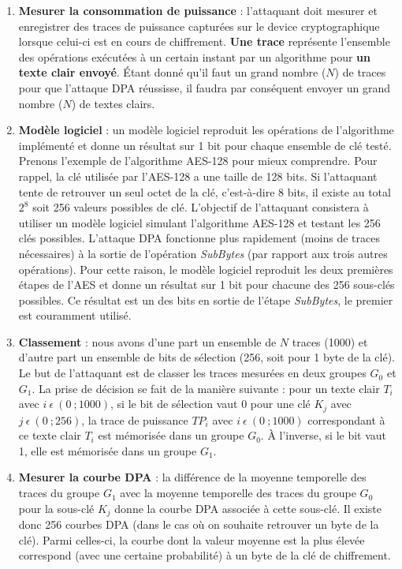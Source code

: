 \documentclass[oneside]{book}
\begin{document}
\begin{enumerate}
\item \textbf{Mesurer la consommation de puissance} : l'attaquant doit mesurer et enregistrer des traces de puissance capturées sur le device cryptographique lorsque celui-ci est en cours de chiffrement. \textbf{Une trace} représente l'ensemble des opérations exécutées à un certain instant par un algorithme pour \textbf{un texte clair envoyé}. Étant donné qu'il faut un grand nombre ($N$) de traces pour que l'attaque DPA réussisse, il faudra par conséquent envoyer un grand nombre ($N$) de textes clairs.
\item \textbf{Modèle logiciel} : un modèle logiciel reproduit les opérations de l’algorithme implémenté et donne un résultat sur 1 bit pour chaque ensemble de clé testé. Prenons l'exemple de l'algorithme AES-128 pour mieux comprendre. Pour rappel, la clé utilisée par l'AES-128 a une taille de 128 bits. Si l'attaquant tente de retrouver un seul octet de la clé, c'est-à-dire 8 bits, il existe au total $2^{8}$ soit 256 valeurs possibles de clé. L'objectif de l'attaquant consistera à utiliser un modèle logiciel simulant l'algorithme AES-128 et testant les 256 clés possibles. L'attaque DPA fonctionne plus rapidement (moins de traces nécessaires) à la sortie de l'opération \textit{SubBytes} \cite{mangard_power_2007} (par rapport aux trois autres opérations). Pour cette raison, le modèle logiciel reproduit les deux premières étapes de l’AES et donne un résultat sur 1 bit pour chacune des 256 sous-clés possibles. Ce résultat est un des bits en sortie de l’étape \textit{SubBytes}, le premier est couramment utilisé.
\item \textbf{Classement} : nous avons d'une part un ensemble de $N$ traces (1000) et d'autre part un ensemble de bits de sélection (256, soit pour 1 byte de la clé). Le but de l'attaquant est de classer les traces mesurées en deux groupes $G_0$ et $G_1$. La prise de décision se fait de la manière suivante : pour un texte clair $T_i$ avec $i \ \epsilon \ (0 \ ;1000)$, si le bit de sélection vaut 0 pour une clé $K_j$ avec $j \ \epsilon \ (0 \ ; 256)$, la trace de puissance $TP_i$ avec $i \ \epsilon \ (0 \ ; 1000)$ correspondant à ce texte clair $T_i$ est mémorisée dans un groupe $G_0$. À l'inverse, si le bit vaut 1, elle est mémorisée dans un groupe $G_1$.
\item \textbf{Mesurer la courbe DPA} : la différence de la moyenne temporelle des traces du groupe $G_1$ avec la moyenne temporelle des traces du groupe $G_0$ pour la sous-clé $K_j$ donne la courbe DPA associée à cette sous-clé. Il existe donc 256 courbes DPA (dans le cas où on souhaite retrouver un byte de la clé). Parmi celles-ci, la courbe dont la valeur moyenne est la plus élevée correspond (avec une certaine probabilité) à un byte de la clé de chiffrement.
\end{enumerate}
\end{document}
